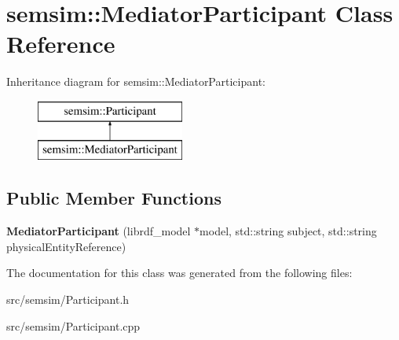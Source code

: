 \hypertarget{classsemsim_1_1MediatorParticipant}{}\section{semsim\+:\+:Mediator\+Participant Class Reference}
\label{classsemsim_1_1MediatorParticipant}
Inheritance diagram for semsim\+:\+:Mediator\+Participant\+:\begin{figure}[H]
\begin{center}
\leavevmode
\includegraphics[height=2.000000cm]{classsemsim_1_1MediatorParticipant}
\end{center}
\end{figure}
\subsection*{Public Member Functions}
\begin{DoxyCompactItemize}
\item 
\mbox{\label{classsemsim_1_1MediatorParticipant_ac9c590a3b879b93dc8dad65de25220ab}} 
{\bfseries Mediator\+Participant} (librdf\+\_\+model $\ast$model, std\+::string subject, std\+::string physical\+Entity\+Reference)
\end{DoxyCompactItemize}


The documentation for this class was generated from the following files\+:\begin{DoxyCompactItemize}
\item 
src/semsim/Participant.\+h\item 
src/semsim/Participant.\+cpp\end{DoxyCompactItemize}
